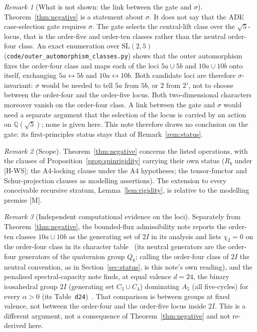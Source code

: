 \documentclass[11pt]{article}
\theoremstyle{definition}
\theoremstyle{remark}
\newtheorem{remark}{Remark}
\begin{document}
    \begin{remark}[What is not shown: the link between the gate and $\sigma$]
      \label{rem:gate-link}
      Theorem~\ref{thm:negative} is a statement about $\sigma$.
      It does not say that the ADE case-selection gate requires $\sigma$.
      The gate selects the central-lift class over the $\sqrt{5}$-locus, that is the order-five and order-ten classes
      rather than the neutral order-four class.
      An exact enumeration over $\mathrm{SL}(2,5)$ (\texttt{code/outer\_automorphism\_classes.py}) shows that the outer
      automorphism fixes the order-four class and maps each of the loci $5a\cup5b$ and $10a\cup10b$ onto itself,
      exchanging $5a\leftrightarrow5b$ and $10a\leftrightarrow10b$.
      Both candidate loci are therefore $\sigma$-invariant: $\sigma$ would be needed to tell $5a$ from $5b$, or $2$
      from $2'$, not to choose between the order-four and the order-five locus.
      Both two-dimensional characters moreover vanish on the order-four class.
      A link between the gate and $\sigma$ would need a separate argument that the selection of the locus is carried by
      an action on $\mathbb{Q}(\sqrt{5})$; none is given here.
      This note therefore draws no conclusion on the gate: its first-principles status stays that of
      Remark~\ref{rem:status}.
    \end{remark}

    \begin{remark}[Scope]
      Theorem~\ref{thm:negative} concerns the listed operations, with the clauses of
      Proposition~\ref{prop:spinrigidity} carrying their own status ($R_b$ under [H-WS]; the A4-locking clause under the
      A4 hypotheses; the tensor-functor and Schur-projection clauses as modelling assertions).
      The extension to every conceivable recursive stratum, Lemma~\ref{lem:rigidity}, is relative to the modelling
      premise [M].
    \end{remark}

    \begin{remark}[Independent computational evidence on the loci]
            Separately from Theorem~\ref{thm:negative}, the bounded-flux admissibility note reports the order-ten classes
      $10a\cup10b$ as the generating set of $2I$ in its analysis and lists $\chi_2=0$ on the order-four class in its
      character table~\cite{Beau2026a1} (its neutral generators are the order-four generators of the quaternion group
      $Q_8$; calling the order-four class of $2I$ the neutral convention, as in Section~\ref{sec:status}, is this
      note's own reading), and the penalised spectral-capacity note
      finds, at equal valence $d=24$, the binary icosahedral group $2I$ (generating set $C_3\cup C_4$) dominating
      $A_5$ (all five-cycles) for every $\alpha>0$ (its Table~\texttt{d24})~\cite{Beau2026a2}.
      That comparison is between groups at fixed valence, not between the order-four and the order-five locus inside
      $2I$.
      This is a different argument, not a consequence of Theorem~\ref{thm:negative} and not re-derived here.
    \end{remark}
\end{document}
